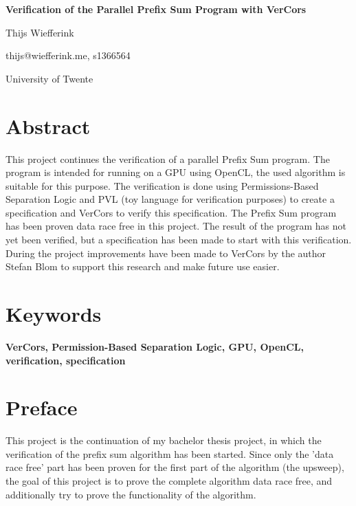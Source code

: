 \documentclass[a4paper]{article}
\begin{document}
\begin{titlepage}
	\begin{center}
		{\huge\bfseries Verification of the Parallel Prefix Sum Program with VerCors\par}
		
		\vspace{1cm}
		{\LARGE Thijs Wiefferink\par}
		{\large thijs@wiefferink.me, s1366564}
		
		\vfill
		
		{\Large
			University of Twente		
		}
	\end{center}

\end{titlepage}
\newpage


\section*{Abstract}
This project continues the verification of a parallel Prefix Sum program. The program is intended for running on a GPU using OpenCL, the used algorithm is suitable for this purpose. The verification is done using Permissions-Based Separation Logic and PVL (toy language for verification purposes) to create a specification and VerCors to verify this specification. The Prefix Sum program has been proven data race free in this project. The result of the program has not yet been verified, but a specification has been made to start with this verification. During the project improvements have been made to VerCors by the author Stefan Blom to support this research and make future use easier.


\section*{Keywords}
\textbf{VerCors, Permission-Based Separation Logic, GPU, OpenCL, verification, specification}


\section*{Preface}
This project is the continuation of my bachelor thesis project, in which the verification of the prefix sum algorithm has been started. Since only the 'data race free' part has been proven for the first part of the algorithm (the upsweep), the goal of this project is to prove the complete algorithm data race free, and additionally try to prove the functionality of the algorithm.
\end{document}
